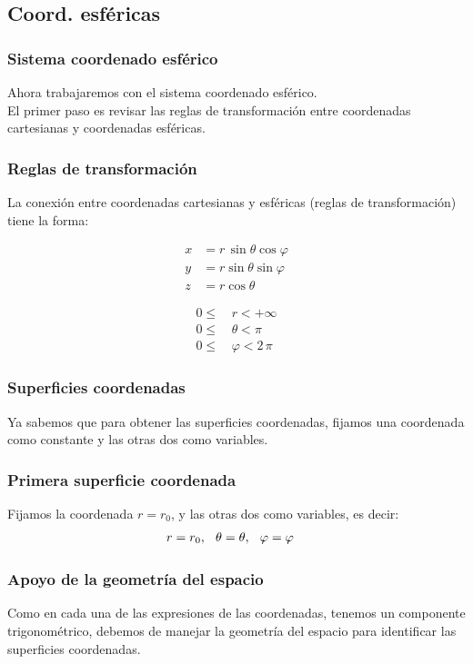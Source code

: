 \documentclass[12pt]{beamer}
\begin{document}
\subsection{Coord. esféricas}

\begin{frame}
\frametitle{Sistema coordenado esférico}
Ahora trabajaremos con el sistema coordenado esférico.
\\
\bigskip
\pause
El primer paso es revisar las reglas de transformación entre coordenadas cartesianas y coordenadas esféricas.
\end{frame}
\begin{frame}
\frametitle{Reglas de transformación}
La conexión entre coordenadas cartesianas y esféricas (reglas de transformación) tiene la forma:
\pause
\begin{minipage}[t]{0.4\linewidth}
\begin{align*}
x &= r \, \sin \theta \cos \varphi \\
y &= r \sin \theta \sin \varphi \\
z &= r \cos \theta
\end{align*}
\end{minipage}
\begin{minipage}[t]{0.4\linewidth}
\begin{align*}
   0 \leq \, &r < +\infty \\[0.5em]
   0 \leq \, &\theta < \pi \\[0.5em]
   0 \leq \, &\varphi < 2 \, \pi
\end{align*}
\end{minipage}
\end{frame}
\begin{frame}
\frametitle{Superficies coordenadas}
Ya sabemos que para obtener las superficies coordenadas, fijamos una coordenada como constante y las otras dos como variables.
\end{frame}
\begin{frame}
\frametitle{Primera superficie coordenada}
Fijamos la coordenada $r = r_{0}$, y las otras dos como variables, es decir:
\begin{align*}
r &= r_{0}, \hspace{0.25cm} \theta = \theta, \hspace{0.25cm} \varphi = \varphi
\end{align*}
\end{frame}
\begin{frame}
\frametitle{Apoyo de la geometría del espacio}
Como en cada una de las expresiones de las coordenadas, tenemos un componente trigonométrico, debemos de manejar la geometría del espacio para identificar las superficies coordenadas.
\end{frame}
\end{document}

